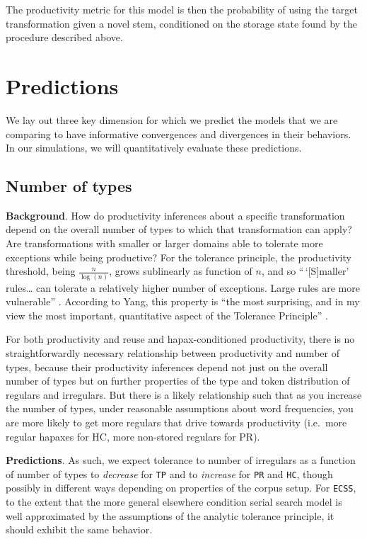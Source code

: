 \documentclass[
   11pt,
       ]{book}
\begin{document}
The productivity metric for this model is then the probability of using the
target transformation given a novel stem, conditioned on the storage state found
by the procedure described above.

\hypertarget{predictions}{%
\section{Predictions}\label{predictions}}

We lay out three key dimension for which we predict the models that we are
comparing to have informative convergences and divergences in their behaviors.
In our simulations, we will quantitatively evaluate these predictions.

\hypertarget{number-of-types}{%
\subsection{Number of types}\label{number-of-types}}

\textbf{Background}. How do productivity inferences about a specific transformation
depend on the overall number of types to which that transformation can apply?
Are transformations with smaller or larger domains able to tolerate more
exceptions while being productive? For the tolerance principle, the productivity
threshold, being \(\frac{n}{\log(n)}\), grows sublinearly as function of \(n\), and
so ``\,`{[}S{]}maller' rules\ldots{} can tolerate a relatively higher number of exceptions.
Large rules are more vulnerable'' \citep[p.~66]{yang2016}. According to Yang, this
property is ``the most surprising, and in my view the most important,
quantitative aspect of the Tolerance Principle'' \citep[p.~66]{yang2016}.

For both productivity and reuse and hapax-conditioned productivity, there is no
straightforwardly necessary relationship between productivity and number of
types, because their productivity inferences depend not just on the overall
number of types but on further properties of the type and token distribution of
regulars and irregulars. But there is a likely relationship such that as you
increase the number of types, under reasonable assumptions about word
frequencies, you are more likely to get more regulars that drive towards
productivity (i.e.~more regular hapaxes for HC, more non-stored regulars for
PR).

\textbf{Predictions}. As such, we expect tolerance to number of irregulars as a
function of number of types to \emph{decrease} for \texttt{TP} and to \emph{increase} for \texttt{PR}
and \texttt{HC}, though possibly in different ways depending on properties of the
corpus setup. For \texttt{ECSS}, to the extent that the more general elsewhere
condition serial search model is well approximated by the assumptions of the
analytic tolerance principle, it should exhibit the same behavior.
\end{document}

